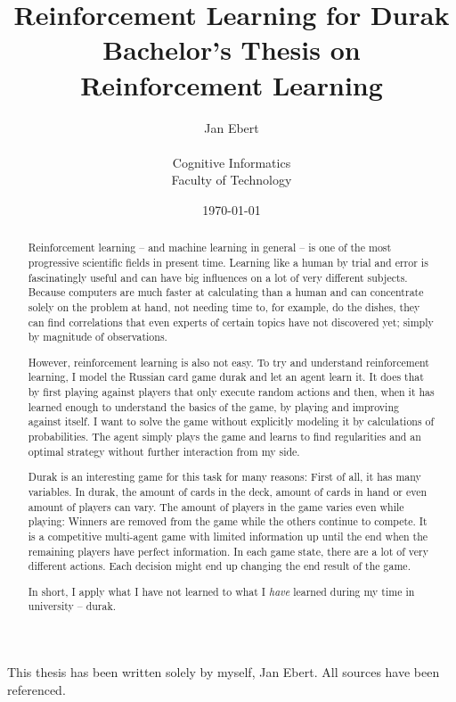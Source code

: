 \documentclass[a4paper,titlepage]{article}
\title{Reinforcement Learning for Durak \\ \medskip \large{Bachelor's Thesis on Reinforcement Learning}}
\author{Jan Ebert \\  \\ \small{Cognitive Informatics} \\ \small{Faculty of Technology}}
\date{\today}
\begin{document}
\maketitle

\noindent
This thesis has been written solely by myself, Jan Ebert. All sources have been referenced.

\begin{abstract}
Reinforcement learning -- and machine learning in general -- is one of the most progressive scientific fields in present time. Learning like a human by trial and error is fascinatingly useful and can have big influences on a lot of very different subjects. Because computers are much faster at calculating than a human and can concentrate solely on the problem at hand, not needing time to, for example, do the dishes, they can find correlations that even experts of certain topics have not discovered yet; simply by magnitude of observations.

However, reinforcement learning is also not easy. To try and understand reinforcement learning, I model the Russian card game durak and let an agent learn it. It does that by first playing against players that only execute random actions and then, when it has learned enough to understand the basics of the game, by playing and improving against itself. I want to solve the game without explicitly modeling it by calculations of probabilities. The agent simply plays the game and learns to find regularities and an optimal strategy without further interaction from my side.

Durak is an interesting game for this task for many reasons: First of all, it has many variables. In durak, the amount of cards in the deck, amount of cards in hand or even amount of players can vary. The amount of players in the game varies even while playing: Winners are removed from the game while the others continue to compete. It is a competitive multi-agent game with limited information up until the end when the remaining players have perfect information. In each game state, there are a lot of very different actions. Each decision might end up changing the end result of the game.

In short, I apply what I have not learned to what I \emph{have} learned during my time in university -- durak.

\end{abstract}

\tableofcontents

\newpage
\end{document}
